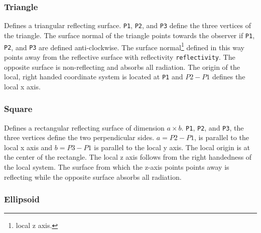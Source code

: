 \documentclass[10pt,a4paper,titlepage]{article}
\begin{document}
\subsubsection{Triangle}







Defines a triangular reflecting surface. {\tt P1}, {\tt P2}, and {\tt P3} define the three vertices of the triangle. The surface normal of the triangle points towards the observer if {\tt P1}, {\tt P2}, and {\tt P3} are defined anti-clockwise. The surface normal\footnote{local z axis.} defined in this way points away from the reflective surface with reflectivity {\tt reflectivity}. The opposite surface is non-reflecting and absorbs all radiation. The origin of the local, right handed coordinate system is located at {\tt P1} and $P2 - P1$ defines the local x axis. 


\subsubsection{Square}







Defines a rectangular reflecting surface of dimension $a \times b$. {\tt P1}, {\tt P2}, and {\tt P3}, the three vertices define the two perpendicular sides. $a=P2-P1$, is parallel to the local x axis and $b=P3 - P1$ is parallel to the local y axis. The local origin is at the center of the rectangle. The local z axis follows from the right handedness of the local system. The surface from which the z-axis points points away is reflecting while the opposite surface absorbs all radiation.

\subsubsection{Ellipsoid}
\end{document}
